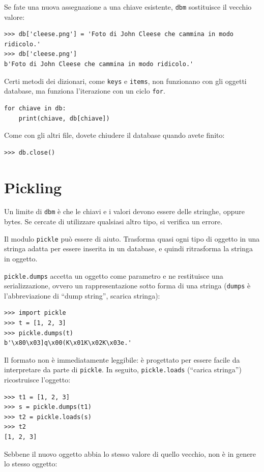 \documentclass[10pt]{book}
\begin{document}
Se fate una nuova assegnazione a una chiave esistente, {\tt dbm} sostituisce il vecchio valore:

\begin{verbatim}
>>> db['cleese.png'] = 'Foto di John Cleese che cammina in modo ridicolo.'
>>> db['cleese.png']
b'Foto di John Cleese che cammina in modo ridicolo.'
\end{verbatim}
%
Certi metodi dei dizionari, come {\tt keys} e {\tt items}, non funzionano con gli oggetti database, ma funziona l'iterazione con un ciclo {\tt for}.

\begin{verbatim}
for chiave in db:
    print(chiave, db[chiave])
\end{verbatim}
%
Come con gli altri file, dovete chiudere il database quando avete finito:

\begin{verbatim}
>>> db.close()
\end{verbatim}
%


\section{Pickling}

Un limite di {\tt dbm} è che le chiavi e i valori devono essere delle stringhe, oppure bytes. Se cercate di utilizzare qualsiasi altro tipo, si verifica un errore.

Il modulo {\tt pickle} può essere di aiuto. Trasforma quasi ogni tipo di oggetto in una stringa adatta per essere inserita in un database, e quindi ritrasforma la stringa in oggetto.

{\tt pickle.dumps} accetta un oggetto come parametro e ne restituisce una serializzazione, ovvero un rappresentazione sotto forma di una stringa ({\tt dumps} è l'abbreviazione di ``dump string'', scarica stringa):

\begin{verbatim}
>>> import pickle
>>> t = [1, 2, 3]
>>> pickle.dumps(t)
b'\x80\x03]q\x00(K\x01K\x02K\x03e.'
\end{verbatim}
%
Il formato non è immediatamente leggibile: è progettato per essere facile da interpretare da parte di {\tt pickle}. In seguito, {\tt pickle.loads}
(``carica stringa'') ricostruisce l'oggetto:

\begin{verbatim}
>>> t1 = [1, 2, 3]
>>> s = pickle.dumps(t1)
>>> t2 = pickle.loads(s)
>>> t2
[1, 2, 3]
\end{verbatim}
%
Sebbene il nuovo oggetto abbia lo stesso valore di quello vecchio, non è in genere lo stesso oggetto:
\end{document}
